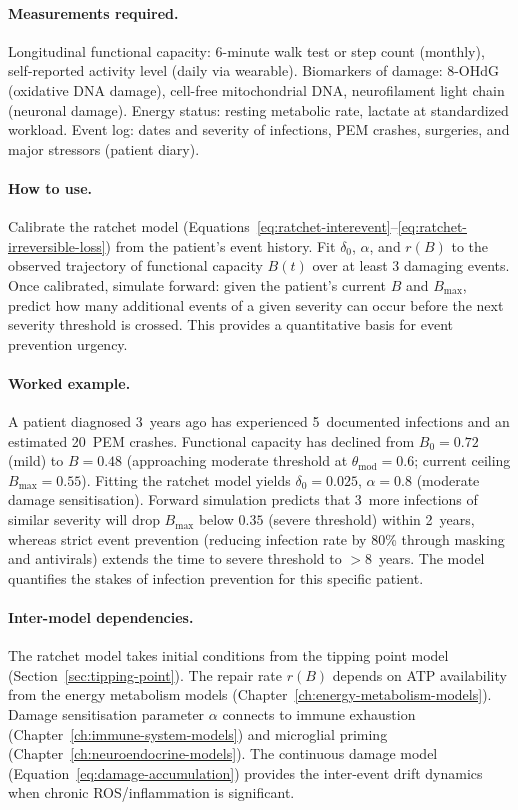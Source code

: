 \paragraph{Measurements required.}
Longitudinal functional capacity: 6-minute walk test or step count (monthly), self-reported activity level (daily via wearable). Biomarkers of damage: 8-OHdG (oxidative DNA damage), cell-free mitochondrial DNA, neurofilament light chain (neuronal damage). Energy status: resting metabolic rate, lactate at standardized workload. Event log: dates and severity of infections, PEM crashes, surgeries, and major stressors (patient diary).

\paragraph{How to use.}
Calibrate the ratchet model (Equations~\ref{eq:ratchet-interevent}--\ref{eq:ratchet-irreversible-loss}) from the patient's event history. Fit $\delta_0$, $\alpha$, and $r(B)$ to the observed trajectory of functional capacity $B(t)$ over at least 3 damaging events. Once calibrated, simulate forward: given the patient's current $B$ and $B_{\max}$, predict how many additional events of a given severity can occur before the next severity threshold is crossed. This provides a quantitative basis for event prevention urgency.

\paragraph{Worked example.}
A patient diagnosed 3~years ago has experienced 5~documented infections and an estimated 20~PEM crashes. Functional capacity has declined from $B_0 = 0.72$ (mild) to $B = 0.48$ (approaching moderate threshold at $\theta_{\text{mod}} = 0.6$; current ceiling $B_{\max} = 0.55$). Fitting the ratchet model yields $\delta_0 = 0.025$, $\alpha = 0.8$ (moderate damage sensitisation). Forward simulation predicts that 3~more infections of similar severity will drop $B_{\max}$ below $0.35$ (severe threshold) within 2~years, whereas strict event prevention (reducing infection rate by 80\% through masking and antivirals) extends the time to severe threshold to $> 8$~years. The model quantifies the stakes of infection prevention for this specific patient.

\paragraph{Inter-model dependencies.}
The ratchet model takes initial conditions from the tipping point model (Section~\ref{sec:tipping-point}). The repair rate $r(B)$ depends on ATP availability from the energy metabolism models (Chapter~\ref{ch:energy-metabolism-models}). Damage sensitisation parameter $\alpha$ connects to immune exhaustion (Chapter~\ref{ch:immune-system-models}) and microglial priming (Chapter~\ref{ch:neuroendocrine-models}). The continuous damage model (Equation~\ref{eq:damage-accumulation}) provides the inter-event drift dynamics when chronic ROS/inflammation is significant.

